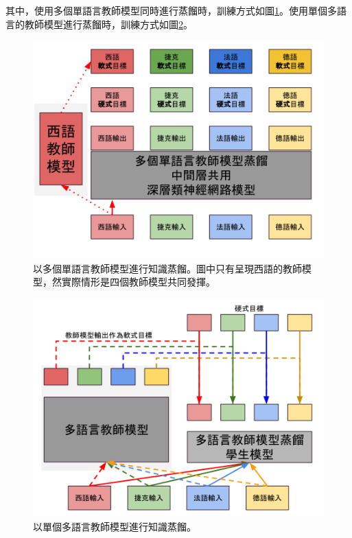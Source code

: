 其中，使用多個單語言教師模型同時進行蒸餾時，訓練方式如圖\ref{fig:chap5_multiple_monolingual_cumbersome}。使用單個多語言的教師模型進行蒸餾時，訓練方式如圖\ref{fig:chap5_single_multilingual_cumbersome}。
\begin{figure}[!ht]
\centering
\includegraphics[scale=0.28]{images/chap5_multiple_monolingual_cumbersome.png}
\caption{以多個單語言教師模型進行知識蒸餾。圖中只有呈現西語的教師模型，然實際情形是四個教師模型共同發揮。}
\label{fig:chap5_multiple_monolingual_cumbersome}
\end{figure}

\begin{figure}[!ht]
\centering
\includegraphics[scale=0.28]{images/chap5_single_multilingual_cumbersome.png}
\caption{以單個多語言教師模型進行知識蒸餾。}
\label{fig:chap5_single_multilingual_cumbersome}
\end{figure}


